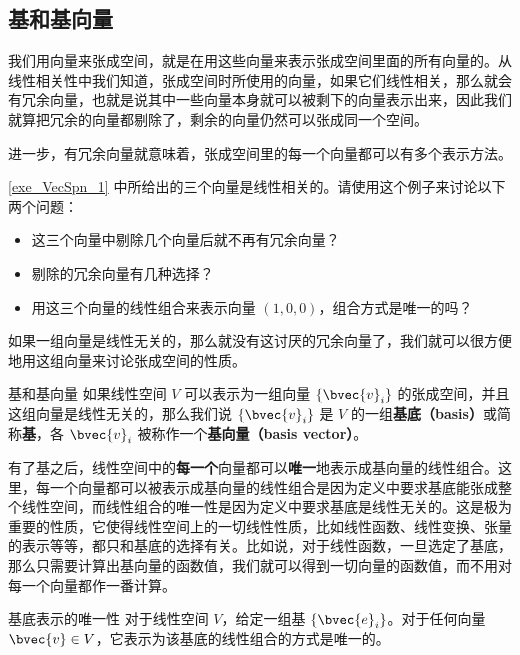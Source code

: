 \subsection{基和基向量}

我们用向量来张成空间，就是在用这些向量来表示张成空间里面的所有向量的。从线性相关性中我们知道，张成空间时所使用的向量，如果它们线性相关，那么就会有冗余向量，也就是说其中一些向量本身就可以被剩下的向量表示出来，因此我们就算把冗余的向量都剔除了，剩余的向量仍然可以张成同一个空间。

进一步，有冗余向量就意味着，张成空间里的每一个向量都可以有多个表示方法。

\begin{exercise}{}
\autoref{exe_VecSpn_1} 中所给出的三个向量是线性相关的。请使用这个例子来讨论以下两个问题：
\begin{itemize}
\item 这三个向量中剔除几个向量后就不再有冗余向量？
\item 剔除的冗余向量有几种选择？
\item 用这三个向量的线性组合来表示向量 $(1,0,0)$，组合方式是唯一的吗？
\end{itemize}
\end{exercise}


如果一组向量是线性无关的，那么就没有这讨厌的冗余向量了，我们就可以很方便地用这组向量来讨论张成空间的性质。

\begin{definition}{基和基向量}\label{def_VecSpn_2}
如果线性空间 $V$ 可以表示为一组向量 $\{\bvec{v}_i\}$ 的张成空间，并且这组向量是线性无关的，那么我们说 $\{\bvec{v}_i\}$ 是 $V$ 的一组\textbf{基底（basis）}或简称\textbf{基}，各 $\bvec{v}_i$ 被称作一个\textbf{基向量（basis vector）}。
\end{definition}

有了基之后，线性空间中的\textbf{每一个}向量都可以\textbf{唯一}地表示成基向量的线性组合。这里，每一个向量都可以被表示成基向量的线性组合是因为定义中要求基底能张成整个线性空间，而线性组合的唯一性是因为定义中要求基底是线性无关的。这是极为重要的性质，它使得线性空间上的一切线性性质，比如线性函数、线性变换、张量的表示等等，都只和基底的选择有关。比如说，对于线性函数，一旦选定了基底，那么只需要计算出基向量的函数值，我们就可以得到一切向量的函数值，而不用对每一个向量都作一番计算。

\begin{theorem}{基底表示的唯一性}\label{the_VecSpn_1}
对于线性空间 $V$，给定一组基 $\{\bvec{e}_i\}$。对于任何向量 $\bvec{v}\in V$，它表示为该基底的线性组合的方式是唯一的。
\end{theorem}

